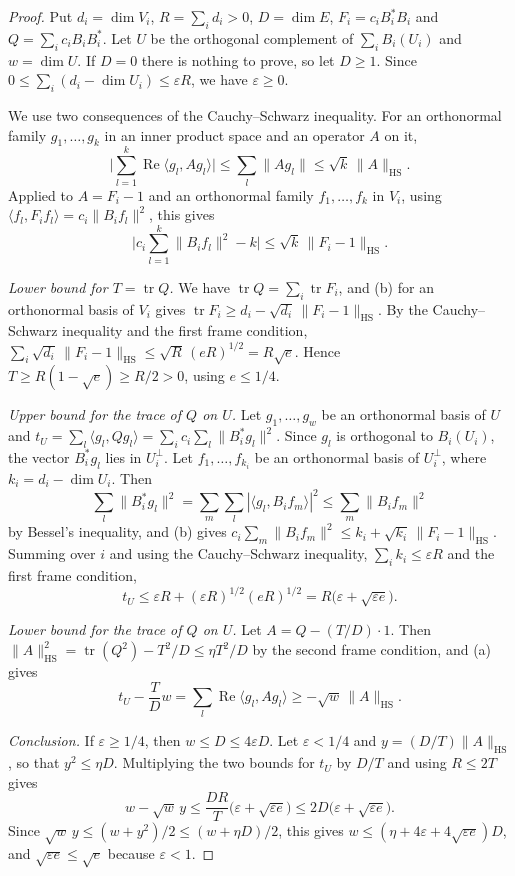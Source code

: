 \begin{proof}
Put $d_i=\dim V_i$, $R=\sum_id_i>0$, $D=\dim E$, $F_i=c_iB_i^*B_i$ and
$Q=\sum_ic_iB_iB_i^*$. Let $U$ be the orthogonal complement of $\sum_iB_i(U_i)$ and $w=\dim U$.
If $D=0$ there is nothing to prove, so let $D\geq1$. Since
$0\leq\sum_i(d_i-\dim U_i)\leq\varepsilon R$, we have $\varepsilon\geq0$.

We use two consequences of the Cauchy--Schwarz inequality. For an orthonormal family
$g_1,\ldots,g_k$ in an inner product space and an operator $A$ on it,
\[
 \Big|\sum_{l=1}^k\operatorname{Re}\langle g_l,Ag_l\rangle\Big|\leq\sum_l\|Ag_l\|
 \leq\sqrt k\,\|A\|_{\mathrm{HS}}. \tag{a}
\]
Applied to $A=F_i-1$ and an orthonormal family $f_1,\ldots,f_k$ in $V_i$, using
$\langle f_l,F_if_l\rangle=c_i\|B_if_l\|^2$, this gives
\[
 \Big|c_i\sum_{l=1}^k\|B_if_l\|^2-k\Big|\leq\sqrt k\,\|F_i-1\|_{\mathrm{HS}}. \tag{b}
\]

\emph{Lower bound for $T=\operatorname{tr}Q$.} We have
$\operatorname{tr}Q=\sum_i\operatorname{tr}F_i$, and (b) for an orthonormal basis of $V_i$ gives
$\operatorname{tr}F_i\geq d_i-\sqrt{d_i}\,\|F_i-1\|_{\mathrm{HS}}$. By the Cauchy--Schwarz
inequality and the first frame condition,
$\sum_i\sqrt{d_i}\,\|F_i-1\|_{\mathrm{HS}}\leq\sqrt R\,(eR)^{1/2}=R\sqrt e$. Hence
$T\geq R(1-\sqrt e)\geq R/2>0$, using $e\leq1/4$.

\emph{Upper bound for the trace of $Q$ on $U$.} Let $g_1,\ldots,g_w$ be an orthonormal basis of
$U$ and $t_U=\sum_l\langle g_l,Qg_l\rangle=\sum_ic_i\sum_l\|B_i^*g_l\|^2$. Since $g_l$ is
orthogonal to $B_i(U_i)$, the vector $B_i^*g_l$ lies in $U_i^\perp$. Let $f_1,\ldots,f_{k_i}$ be an
orthonormal basis of $U_i^\perp$, where $k_i=d_i-\dim U_i$. Then
\[
 \sum_l\|B_i^*g_l\|^2=\sum_m\sum_l|\langle g_l,B_if_m\rangle|^2\leq\sum_m\|B_if_m\|^2
\]
by Bessel's inequality, and (b) gives
$c_i\sum_m\|B_if_m\|^2\leq k_i+\sqrt{k_i}\,\|F_i-1\|_{\mathrm{HS}}$. Summing over $i$ and using
the Cauchy--Schwarz inequality, $\sum_ik_i\leq\varepsilon R$ and the first frame condition,
\[
 t_U\leq\varepsilon R+(\varepsilon R)^{1/2}(eR)^{1/2}=R\big(\varepsilon+\sqrt{\varepsilon e}\big).
\]

\emph{Lower bound for the trace of $Q$ on $U$.} Let $A=Q-(T/D)\cdot1$. Then
$\|A\|_{\mathrm{HS}}^2=\operatorname{tr}(Q^2)-T^2/D\leq\eta T^2/D$ by the second frame condition,
and (a) gives
\[
 t_U-\frac TDw=\sum_l\operatorname{Re}\langle g_l,Ag_l\rangle\geq-\sqrt w\,\|A\|_{\mathrm{HS}}.
\]

\emph{Conclusion.} If $\varepsilon\geq1/4$, then $w\leq D\leq4\varepsilon D$. Let
$\varepsilon<1/4$ and $y=(D/T)\|A\|_{\mathrm{HS}}$, so that $y^2\leq\eta D$. Multiplying the two
bounds for $t_U$ by $D/T$ and using $R\leq2T$ gives
\[
 w-\sqrt w\,y\leq\frac{DR}{T}\big(\varepsilon+\sqrt{\varepsilon e}\big)\leq2D\big(\varepsilon+\sqrt{\varepsilon e}\big).
\]
Since $\sqrt w\,y\leq(w+y^2)/2\leq(w+\eta D)/2$, this gives
$w\leq(\eta+4\varepsilon+4\sqrt{\varepsilon e})D$, and $\sqrt{\varepsilon e}\leq\sqrt e$
because $\varepsilon<1$.
\end{proof}


